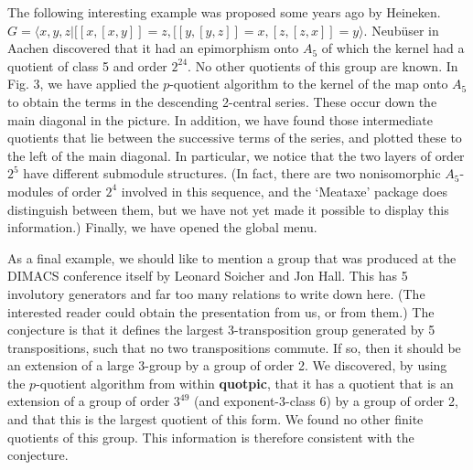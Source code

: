 The following  interesting example was proposed some years ago by Heineken.
$G = \langle x,y,z | [[x,[x,y]]=z, [[y,[y,z]]=x, [z,[z,x]]=y  \rangle$.
Neub\"{u}ser in Aachen discovered that it had an epimorphism onto $A_5$
of which the kernel had a quotient of class 5 and order $2^{24}$. No other
quotients of this group are known. In Fig. 3, we have applied the
$p$-quotient algorithm to the kernel of the map onto $A_5$ to obtain the
terms in the descending 2-central series. These occur down the main diagonal
in the picture. In addition, we have found those intermediate quotients
that lie between the successive terms of the series, and plotted these to
the left of the main diagonal. In particular, we notice that the two
layers of order $2^5$ have different submodule structures. (In fact, there
are two nonisomorphic $A_5$-modules of order $2^4$ involved in this sequence,
and the `Meataxe' package does distinguish between them, but we have not yet
made it possible to display this information.) Finally, we have opened the
global menu.

\topinsert
{}
\vskip 123mm
 \endcaption
\endinsert

As a final example, we should like to mention a group that was
produced at the DIMACS conference itself by Leonard Soicher and Jon Hall.
This has 5 involutory generators and far too many relations to write
down here. (The interested reader could obtain the presentation from
us, or from them.) The conjecture is that it defines the largest
3-transposition group generated by 5 transpositions, such that no two
transpositions commute. If so, then it should be an extension of a large 
3-group by a group of order 2. We discovered, by using the $p$-quotient
algorithm from within {\bf quotpic}, that it has a quotient that is
an extension of a group of order $3^{49}$ (and exponent-3-class 6)
by a group of order 2, and that this is the largest quotient of this form.
We found no other finite quotients of this group. This information is
therefore consistent with the conjecture.

